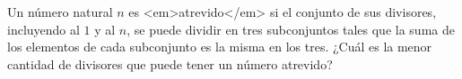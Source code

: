 Un número natural $n$ es <em>atrevido</em> si el conjunto de sus divisores, incluyendo al $1$ y al $n$, se puede dividir en tres subconjuntos tales que la suma de los elementos de cada subconjunto es la misma en los tres. ¿Cuál es la menor cantidad de divisores que puede tener un número atrevido?
